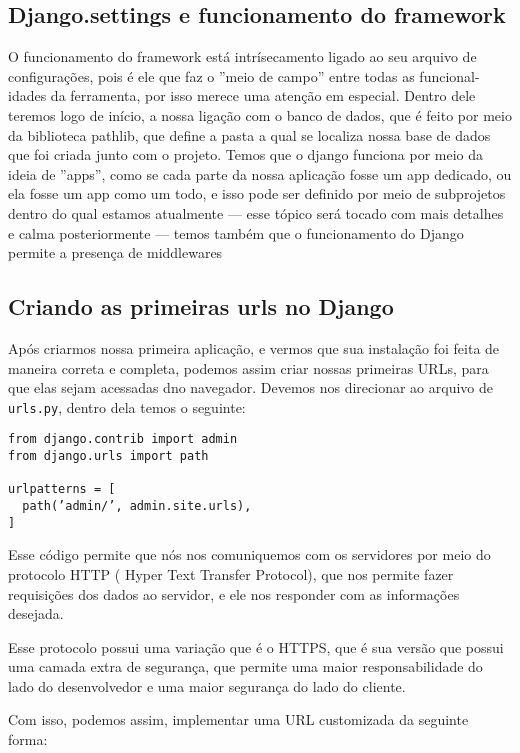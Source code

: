\documentclass[12pt, a4paper]{paper}
\begin{document}
\subsection{Django.settings e funcionamento do framework} %
\label{sub:Django.settings e funcionamento do framework}
O funcionamento do framework está intrísecamento ligado ao seu arquivo de
configurações, pois é ele que faz o ”meio de campo” entre todas as funcional-
idades da ferramenta, por isso merece uma atenção em especial. Dentro dele
teremos logo de início, a nossa ligação com o banco de dados, que é feito por
meio da biblioteca pathlib, que define a pasta a qual se localiza nossa base
de dados que foi criada junto com o projeto.
Temos que o django funciona por meio da ideia de ”apps”, como se cada
parte da nossa aplicação fosse um app dedicado, ou ela fosse um app como
um todo, e isso pode ser definido por meio de subprojetos dentro do qual
estamos atualmente — esse tópico será tocado com mais detalhes e calma
posteriormente — temos também que o funcionamento do Django permite a
presença de middlewares 

\subsection{Criando as primeiras urls no Django} %
\label{sub:Criando as primeiras urls no Django}
Após criarmos nossa primeira aplicação, e vermos que sua instalação foi feita
de maneira correta e completa, podemos assim criar nossas primeiras URLs,
para que elas sejam acessadas dno navegador. Devemos nos direcionar ao
arquivo de \texttt{urls.py}, dentro dela temos o seguinte:

\begin{verbatim}
from django.contrib import admin
from django.urls import path
  
urlpatterns = [
  path(’admin/’, admin.site.urls),
]
\end{verbatim}

Esse código permite que nós nos comuniquemos com os servidores por meio do 
protocolo HTTP ( Hyper Text Transfer Protocol), que nos permite fazer requisições
dos dados ao servidor, e ele nos responder com as informações desejada.
 
Esse protocolo possui uma variação que é o HTTPS, que é sua versão que possui uma 
camada extra de segurança, que permite uma maior responsabilidade do lado do 
desenvolvedor e uma maior segurança do lado do cliente. 

Com isso, podemos assim, implementar uma URL customizada da seguinte forma:
\end{document}
